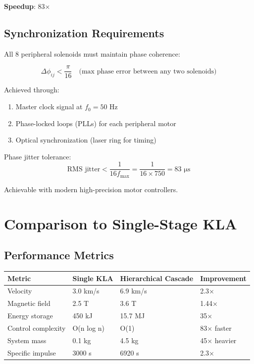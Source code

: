\documentclass[12pt,a4paper]{article}
\begin{document}
\textbf{Speedup}: 83×

\subsection{Synchronization Requirements}

All 8 peripheral solenoids must maintain phase coherence:

\begin{equation}
\Delta \phi_{ij} < \frac{\pi}{16} \quad \text{(max phase error between any two solenoids)}
\end{equation}

Achieved through:
\begin{enumerate}
\item Master clock signal at $f_0 = 50$ Hz
\item Phase-locked loops (PLLs) for each peripheral motor
\item Optical synchronization (laser ring for timing)
\end{enumerate}

Phase jitter tolerance:
\begin{equation}
\text{RMS jitter} < \frac{1}{16 f_{\text{max}}} = \frac{1}{16 \times 750} = 83 \text{ μs}
\end{equation}

Achievable with modern high-precision motor controllers.

\section{Comparison to Single-Stage KLA}

\subsection{Performance Metrics}

\begin{center}
\begin{tabular}{|l|l|l|l|}
\hline
\textbf{Metric} & \textbf{Single KLA} & \textbf{Hierarchical Cascade} & \textbf{Improvement} \\
\hline
Velocity & 3.0 km/s & 6.9 km/s & 2.3× \\
Magnetic field & 2.5 T & 3.6 T & 1.44× \\
Energy storage & 450 kJ & 15.7 MJ & 35× \\
Control complexity & O(n log n) & O(1) & 83× faster \\
System mass & 0.1 kg & 4.5 kg & 45× heavier \\
Specific impulse & 3000 s & 6920 s & 2.3× \\
\hline
\end{tabular}
\end{center}
\end{document}
